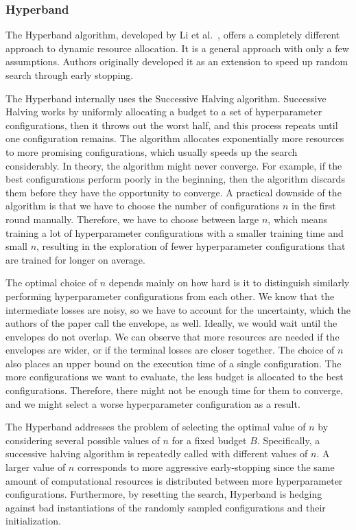 \subsubsection{Hyperband}
The Hyperband algorithm, developed by Li et al.~\cite{li2018hyperband}, offers a completely different approach to dynamic resource allocation. It is a general approach with only a few assumptions. Authors originally developed it as an extension to speed up random search through early stopping.

The Hyperband internally uses the Successive Halving algorithm. Successive Halving works by uniformly allocating a budget to a set of hyperparameter configurations, then it throws out the worst half, and this process repeats until one configuration remains. The algorithm allocates exponentially more resources to more promising configurations, which usually speeds up the search considerably. In theory, the algorithm might never converge. For example, if the best configurations perform poorly in the beginning, then the algorithm discards them before they have the opportunity to converge. A practical downside of the algorithm is that we have to choose the number of configurations $n$ in the first round manually. Therefore, we have to choose between large $n$, which means training a lot of hyperparameter configurations with a smaller training time and small $n$, resulting in the exploration of fewer hyperparameter configurations that are trained for longer on average.

The optimal choice of $n$ depends mainly on how hard is it to distinguish similarly performing hyperparameter configurations from each other. We know that the intermediate losses are noisy, so we have to account for the uncertainty, which the authors of the paper call the envelope, as well. Ideally, we would wait until the envelopes do not overlap. We can observe that more resources are needed if the envelopes are wider, or if the terminal losses are closer together. The choice of $n$ also places an upper bound on the execution time of a single configuration. The more configurations we want to evaluate, the less budget is allocated to the best configurations. Therefore, there might not be enough time for them to converge, and we might select a worse hyperparameter configuration as a result.

The Hyperband addresses the problem of selecting the optimal value of $n$ by considering several possible values of $n$ for a fixed budget $B$. Specifically, a successive halving algorithm is repeatedly called with different values of $n$. A larger value of $n$ corresponds to more aggressive early-stopping since the same amount of computational resources is distributed between more hyperparameter configurations. Furthermore, by resetting the search, Hyperband is hedging against bad instantiations of the randomly sampled configurations and their initialization.

